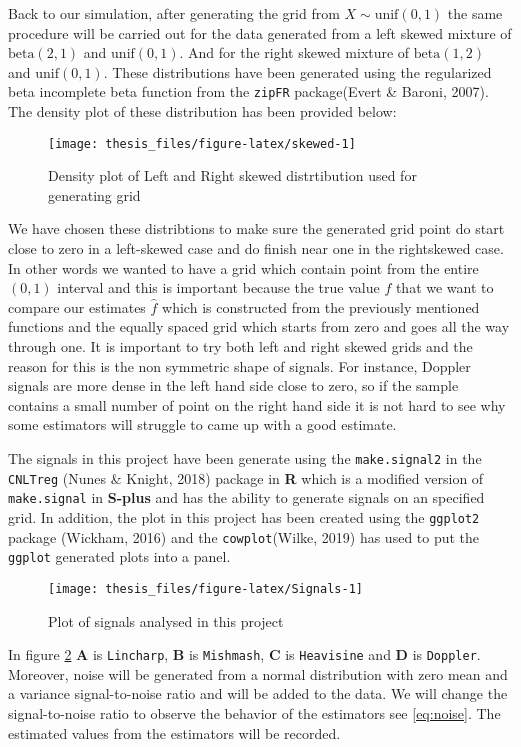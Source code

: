 \documentclass[12pt,twoside, a4paper]{reedthesis}
\begin{document}
Back to our simulation, after generating the grid from \(X \sim \text{unif}(0,1)\) the same procedure will be carried out for the data generated from a left skewed mixture of \(\text{beta}(2,1)\) and \(\text{unif}(0,1)\). And for the right skewed mixture of \(\text{beta}(1,2)\) and \(\text{unif}(0,1)\). These distributions have been generated using the regularized beta incomplete beta function from the \texttt{zipFR} package(Evert \& Baroni, 2007). The density plot of these distribution has been provided below:
\begin{figure}[htb!]

{\centering \texttt{[image: thesis\_files/figure-latex/skewed-1]} 

}

\caption{\label{fig:skewed} Density plot of Left and Right skewed distrtibution used for generating grid}\label{fig:skewed}
\end{figure}
We have chosen these distribtions to make sure the generated grid point do start close to zero in a left-skewed case and do finish near one in the rightskewed case. In other words we wanted to have a grid which contain point from the entire \((0,1)\) interval and this is important because the true value \(f\) that we want to compare our estimates \(\hat f\) which is constructed from the previously mentioned functions and the equally spaced grid which starts from zero and goes all the way through one. It is important to try both left and right skewed grids and the reason for this is the non symmetric shape of signals. For instance, Doppler signals are more dense in the left hand side close to zero, so if the sample contains a small number of point on the right hand side it is not hard to see why some estimators will struggle to came up with a good estimate.

The signals in this project have been generate using the \texttt{make.signal2} in the \texttt{CNLTreg} (Nunes \& Knight, 2018) package in \textbf{R} which is a modified version of \texttt{make.signal} in \textbf{S-plus} and has the ability to generate signals on an specified grid. In addition, the plot in this project has been created using the \texttt{ggplot2} package (Wickham, 2016) and the \texttt{cowplot}(Wilke, 2019) has used to put the \texttt{ggplot} generated plots into a panel.
\begin{figure}[htb!]

{\centering \texttt{[image: thesis\_files/figure-latex/Signals-1]} 

}

\caption{\label{fig:Signals}Plot of signals analysed in this project}\label{fig:Signals}
\end{figure}
In figure \ref{fig:Signals} \textbf{A} is \texttt{Lincharp}, \textbf{B} is \texttt{Mishmash}, \textbf{C} is \texttt{Heavisine} and \textbf{D} is \texttt{Doppler}. Moreover, noise will be generated from a normal distribution with zero mean and a variance signal-to-noise ratio and will be added to the data. We will change the signal-to-noise ratio to observe the behavior of the estimators see \eqref{eq:noise}. The estimated values from the estimators will be recorded.
\end{document}

